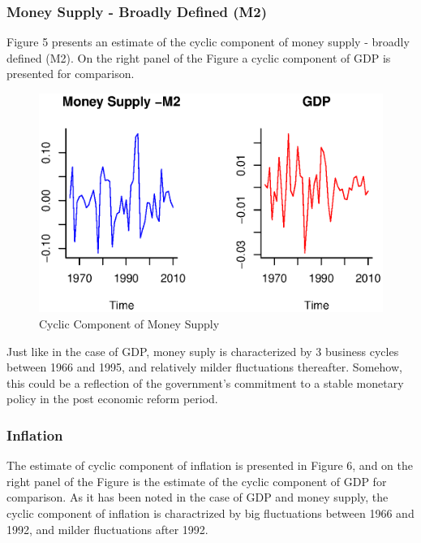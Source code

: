 \documentclass[12pt,a4paper,final]{article}
\begin{document}
\subsubsection{Money Supply - Broadly Defined (M2)}

Figure 5 presents an estimate of the cyclic component of money supply - broadly defined (M2). On the right panel of the Figure a cyclic component of GDP is presented for comparison.

\begin{figure}[ht]
\centering
\begin{small}
\caption{Cyclic Component of Money Supply}
\end{small}
\includegraphics[scale=0.601]{money_supply.eps} 
\end{figure}

Just like in the case of GDP, money suply is characterized by 3 business cycles between 1966 and 1995, and relatively milder fluctuations thereafter. Somehow, this could be a reflection of the government's commitment to a stable monetary policy in the post economic reform period. 

\subsubsection{Inflation}

The estimate of cyclic component of inflation is presented in Figure 6, and on the right panel of the Figure is the estimate of the cyclic component of GDP for comparison. As it has been noted in the case of GDP and money supply, the cyclic component of inflation is charactrized by big fluctuations between 1966 and 1992, and milder fluctuations after 1992. 
\end{document}
